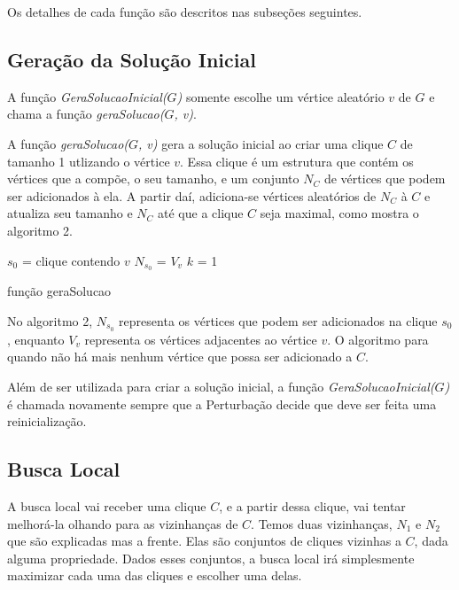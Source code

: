 \documentclass{article}
\begin{document}
Os  detalhes de cada função são descritos nas subseções seguintes. 

\subsection{Geração da Solução Inicial}

A função \textit{GeraSolucaoInicial($G$)} somente escolhe um vértice aleatório $v$ de $G$ e chama a função \textit{geraSolucao($G$, v)}.\par

A função \textit{geraSolucao($G$, v)} gera a solução inicial ao criar uma clique $C$ de tamanho 1 utlizando o vértice $v$. Essa clique é um estrutura que contém os vértices que a compõe, o seu tamanho, e um conjunto $N_C$ de vértices que podem ser adicionados à ela. A partir daí, adiciona-se vértices aleatórios de $N_C$ à $C$ e atualiza seu tamanho e $N_C$ até que a clique $C$ seja maximal, como mostra o algoritmo 2.\par

\begin{algorithm}
 $s_0$ = clique contendo $v$\;
 $N_{s_0}$ = $V_v$\;
 $k$ = 1\;
 \caption{função geraSolucao}
\end{algorithm}

No algoritmo 2, $N_{s_0}$ representa os vértices que podem ser adicionados na clique $s_0$, enquanto $V_v$ representa os vértices adjacentes ao vértice $v$. O algoritmo para quando não há mais nenhum vértice que possa ser adicionado a $C$.\par

Além de ser utilizada para criar a solução inicial, a função \textit{GeraSolucaoInicial($G$)} é chamada novamente sempre que a Perturbação decide que deve ser feita uma reinicialização.

\subsection{Busca Local}

A busca local vai receber uma clique $C$, e a partir dessa clique, vai tentar melhorá-la olhando para as vizinhanças de $C$. Temos duas vizinhanças, $N_1$ e $N_2$ que são explicadas mas a frente. Elas são conjuntos de cliques vizinhas a $C$, dada alguma propriedade. Dados esses conjuntos, a busca local irá simplesmente maximizar cada uma das cliques e escolher uma delas.\par
\end{document}
